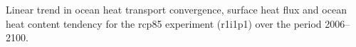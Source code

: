 \label{fig:noresm_full}
Linear trend in ocean heat transport convergence, surface heat flux and ocean heat content tendency for the rcp85 experiment (r1i1p1) over the period 2006--2100.